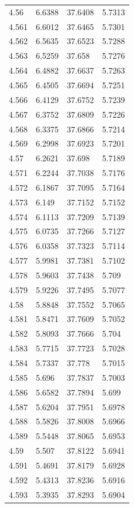 \begin{tabular}{llll}
4.56 & 6.6388 & 37.6408 & 5.7313 \\
4.561 & 6.6012 & 37.6465 & 5.7301 \\
4.562 & 6.5635 & 37.6523 & 5.7288 \\
4.563 & 6.5259 & 37.658 & 5.7276 \\
4.564 & 6.4882 & 37.6637 & 5.7263 \\
4.565 & 6.4505 & 37.6694 & 5.7251 \\
4.566 & 6.4129 & 37.6752 & 5.7239 \\
4.567 & 6.3752 & 37.6809 & 5.7226 \\
4.568 & 6.3375 & 37.6866 & 5.7214 \\
4.569 & 6.2998 & 37.6923 & 5.7201 \\
4.57 & 6.2621 & 37.698 & 5.7189 \\
4.571 & 6.2244 & 37.7038 & 5.7176 \\
4.572 & 6.1867 & 37.7095 & 5.7164 \\
4.573 & 6.149 & 37.7152 & 5.7152 \\
4.574 & 6.1113 & 37.7209 & 5.7139 \\
4.575 & 6.0735 & 37.7266 & 5.7127 \\
4.576 & 6.0358 & 37.7323 & 5.7114 \\
4.577 & 5.9981 & 37.7381 & 5.7102 \\
4.578 & 5.9603 & 37.7438 & 5.709 \\
4.579 & 5.9226 & 37.7495 & 5.7077 \\
4.58 & 5.8848 & 37.7552 & 5.7065 \\
4.581 & 5.8471 & 37.7609 & 5.7052 \\
4.582 & 5.8093 & 37.7666 & 5.704 \\
4.583 & 5.7715 & 37.7723 & 5.7028 \\
4.584 & 5.7337 & 37.778 & 5.7015 \\
4.585 & 5.696 & 37.7837 & 5.7003 \\
4.586 & 5.6582 & 37.7894 & 5.699 \\
4.587 & 5.6204 & 37.7951 & 5.6978 \\
4.588 & 5.5826 & 37.8008 & 5.6966 \\
4.589 & 5.5448 & 37.8065 & 5.6953 \\
4.59 & 5.507 & 37.8122 & 5.6941 \\
4.591 & 5.4691 & 37.8179 & 5.6928 \\
4.592 & 5.4313 & 37.8236 & 5.6916 \\
4.593 & 5.3935 & 37.8293 & 5.6904 \\

\end{tabular}
